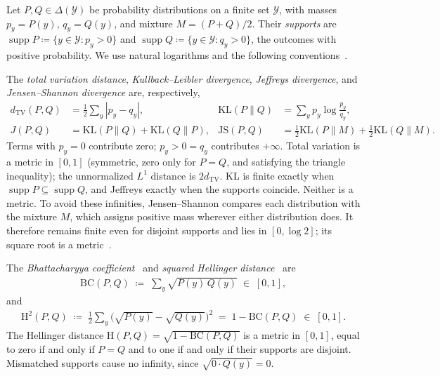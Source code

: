 Let $P,Q\in\Delta(\mathcal Y)$ be probability distributions on a finite set $\mathcal Y$, with masses $p_y=P(y)$, $q_y=Q(y)$, and mixture $M=(P+Q)/2$. Their \emph{supports} are $\operatorname{supp}P\coloneqq\{y\in\mathcal Y:p_y>0\}$ and $\operatorname{supp}Q\coloneqq\{y\in\mathcal Y:q_y>0\}$, the outcomes with positive probability. We use natural logarithms and the following conventions~\parencite[Chapter~7]{PolyanskiyWu2025InformationTheory}.
\begin{definition}\label{def:probability_divergences}
The \emph{total variation distance}, \emph{Kullback--Leibler divergence}, \emph{Jeffreys divergence}, and \emph{Jensen--Shannon divergence} are, respectively,
\begin{align*}
 d_{\mathrm{TV}}(P,Q)&=\tfrac12\sum_y|p_y-q_y|,
 &\mathrm{KL}(P\|Q)&=\sum_y p_y\log\frac{p_y}{q_y},\\
 J(P,Q)&=\mathrm{KL}(P\|Q)+\mathrm{KL}(Q\|P),
 &\mathrm{JS}(P,Q)&=\tfrac12\mathrm{KL}(P\|M)+\tfrac12\mathrm{KL}(Q\|M).
\end{align*}
Terms with $p_y=0$ contribute zero; $p_y>0=q_y$ contributes $+\infty$. Total variation is a metric in $[0,1]$ (symmetric, zero only for $P=Q$, and satisfying the triangle inequality); the unnormalized $L^1$ distance is $2d_{\mathrm{TV}}$. KL is finite exactly when $\operatorname{supp}P\subseteq\operatorname{supp}Q$, and Jeffreys exactly when the supports coincide. Neither is a metric. To avoid these infinities, Jensen--Shannon compares each distribution with the mixture $M$, which assigns positive mass wherever either distribution does. It therefore remains finite even for disjoint supports and lies in $[0,\log 2]$; its square root is a metric~\parencite{EndresSchindelin2003Metric}.
\end{definition}

\begin{definition}\label{def:bc_hellinger}
The \emph{Bhattacharyya coefficient}~\parencite{Bhattacharyya1943} and \emph{squared Hellinger distance}~\parencite{Hellinger1909} are
\begin{align}\label{ptnb:eq:bc-def}
    \mathrm{BC}(P, Q) \;\coloneqq\; \sum_{y} \sqrt{P(y)\, Q(y)} \;\in\; [0, 1],
\end{align}
and
\begin{align}\label{ptnb:eq:hellinger-def}
    \mathrm{H}^2(P, Q) \;\coloneqq\; \tfrac{1}{2} \sum_y \bigl(\sqrt{P(y)} - \sqrt{Q(y)}\bigr)^2 \;=\;
    1 - \mathrm{BC}(P, Q) \;\in\; [0, 1].
\end{align}
The Hellinger distance $\mathrm H(P,Q)=\sqrt{1-\mathrm{BC}(P,Q)}$ is a metric in $[0,1]$, equal to zero if and only if $P=Q$ and to one if and only if their supports are disjoint. Mismatched supports cause no infinity, since $\sqrt{0\cdot Q(y)}=0$.
\end{definition}

